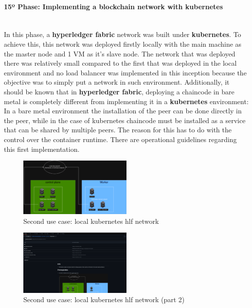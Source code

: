 \paragraph{15º Phase: Implementing a blockchain network with kubernetes}\mbox{}\\
In this phase, a \textbf{hyperledger fabric} network was built under \textbf{kubernetes}. To achieve this, this network was deployed firstly locally with the main machine as the master node and 1 VM as it's slave node. The network that was deployed there was relatively small compared to the first that was deployed in the local environment and no load balancer was implemented in this inception because the objective was to simply put a network in such environment. Additionally, it should be known that in \textbf{hyperledger fabric}, deploying a chaincode in bare metal is completely different from implementing it in a \textbf{kubernetes} environment: In a bare metal environment the installation of the peer can be done directly in the peer, while in the case of kubernetes chaincode must be installed as a service that can be shared by multiple peers. The reason for this has to do with the control over the container runtime. There are operational guidelines regarding this first implementation.

\begin{figure}[H]
    \centering
    \includegraphics[width=0.5\textwidth]{assets/use-case-2/hlf-kuber-premise-network.png} %
    \caption{Second use case: local kubernetes hlf network}
    \label{fig:sample-image} 
\end{figure}

\begin{figure}[H]
    \centering
    \includegraphics[width=0.5\textwidth]{assets/use-case-2/hlf-kuber-premise-network2.png} %
    \caption{Second use case: local kubernetes hlf network (part 2)}
    \label{fig:sample-image} 
\end{figure}

